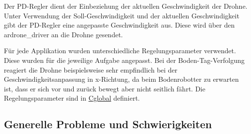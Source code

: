 Der PD-\/Regler dient der Einbeziehung der aktuellen Geschwindigkeit der Drohne. Unter Verwendung der Soll-\/Geschwindigkeit und der aktuellen Geschwindigkeit gibt der PD-\/Regler eine angepasste Geschwindigkeit aus. Diese wird über den ardrone\_\-driver an die Drohne gesendet.

Für jede Applikation wurden unterschiedliche Regelungsparameter verwendet. Diese wurden für die jeweilige Aufgabe angepasst. Bei der Boden-\/Tag-\/Verfolgung reagiert die Drohne beispielsweise sehr empfindlich bei der Geschwindigkeitsanpassung in x-\/Richtung, da beim Bodenrobotter zu erwarten ist, dass er sich vor und zurück bewegt aber nicht seitlich fährt. Die Regelungsparameter sind in \hyperlink{class_cglobal}{Cglobal} definiert.

\subsection*{Generelle Probleme und Schwierigkeiten}

